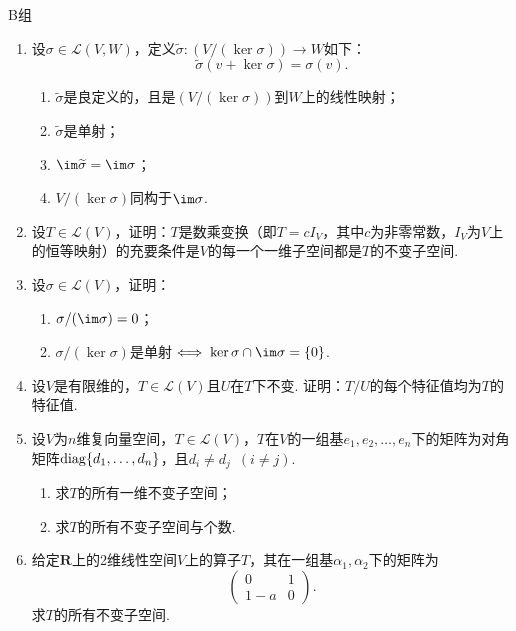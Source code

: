 \centerline{\heiti B组}
\begin{enumerate}
    \item 设$\sigma\in \mathcal{L}(V,W)$，定义$\widetilde{\sigma}:(V/(\ker \sigma))\to W$如下：
          \[\widetilde{\sigma}(v+\ker\sigma)=\sigma(v).\]
          \begin{enumerate}
              \item $\widetilde{\sigma}$是良定义的，且是$(V/(\ker \sigma))$到$W$上的线性映射；

              \item $\widetilde{\sigma}$是单射；

              \item $\im \widetilde{\sigma}=\im \sigma$；

              \item $V/(\ker \sigma)$同构于$\im \sigma$.
          \end{enumerate}

    \item 设$T\in \mathcal{L}(V)$，证明：$T$是数乘变换（即$T=cI_V$，其中$c$为非零常数，$I_V$为$V$上的恒等映射）的充要条件是$V$的每一个一维子空间都是$T$的不变子空间.

    \item 设$\sigma\in \mathcal{L}(V)$，证明：
          \begin{enumerate}
              \item $\sigma/(\im \sigma)=0$；

              \item $\sigma/(\ker \sigma)$是单射$\iff \ker \sigma\cap\im \sigma=\{0\}$.
          \end{enumerate}

    \item 设$V$是有限维的，$T\in \mathcal{L}(V)$且$U$在$T$下不变. 证明：$T/U$的每个特征值均为$T$的特征值.

    \item 设$V$为$n$维复向量空间，$T\in \mathcal{L}(V)$，$T$在$V$的一组基$e_1,e_2,\ldots,e_n$下的矩阵为对角矩阵$\operatorname{diag}\{d_1,\ldots,d_n\}$，且$d_i\neq d_j\enspace(i\neq j)$.
          \begin{enumerate}
              \item 求$T$的所有一维不变子空间；

              \item 求$T$的所有不变子空间与个数.
          \end{enumerate}

    \item 给定$\mathbf{R}$上的2维线性空间$V$上的算子$T$，其在一组基$\alpha_1,\alpha_2$下的矩阵为
          \[\begin{pmatrix}
                  0 & 1 \\ 1-a & 0
              \end{pmatrix}.\]
          求$T$的所有不变子空间.


\end{enumerate}
